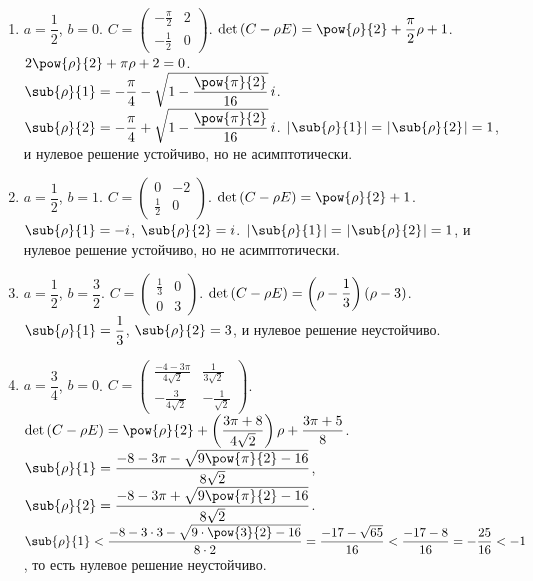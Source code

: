 \documentclass[a5paper,10pt]{article}
\begin{document}
\begin{enumerate}[label={\asbuk*})]
    \item $a = \dfrac {1} {2}$, $b = 0$. 
    $C = \begin{pmatrix} -\frac {\pi} {2} & 2 \\[0.25em] -\frac {1} {2} & 0 \end{pmatrix}$.
    $\det\br{C - \rho E} = \pow{\rho}{2} + \dfrac {\pi} {2} \rho + 1$.
    $2\pow{\rho}{2} + \pi \rho + 2 = 0$. \\
    $\sub{\rho}{1} = -\dfrac {\pi} {4} - \sqrt{1 - \dfrac {\pow{\pi}{2}} {16}}\, i$.
    $\sub{\rho}{2} = -\dfrac {\pi} {4} + \sqrt{1 - \dfrac {\pow{\pi}{2}} {16}}\,i$.
    \vspace{2mm}  $\vbr{\sub{\rho}{1}} = \vbr{\sub{\rho}{2}} = 1$,
    и нулевое решение устойчиво, но не асимптотически.
    
    \item $a = \dfrac {1} {2}$, $b = 1$.
    $C = \begin{pmatrix} 0 & -2 \\ \frac {1} {2} & 0 \end{pmatrix}$.
    $\det\br{C - \rho E} = \pow{\rho}{2} + 1$.
    $\sub{\rho}{1} = -i$,
    $\sub{\rho}{2} = i$.
    $\vbr{\sub{\rho}{1}} = \vbr{\sub{\rho}{2}} = 1$,
    и нулевое решение устойчиво, но не асимптотически.
    
    \item $a = \dfrac {1} {2}$, $b = \dfrac {3} {2}$.
    $C = \begin{pmatrix} \frac {1} {3} & 0 \\ 0 & 3 \end{pmatrix}$.
    $\det\left(\hspace{0.01em}C - \rho E\hspace{0.01em}\right) = \left(\hspace{0.01em}\rho - \dfrac {1} {3}\hspace{0.01em}\right) \left(\hspace{0.01em}\rho - 3\hspace{0.01em}\right)$.
    $\sub{\rho}{1} = \dfrac {1} {3}$, $\sub{\rho}{2} = 3$,
    и нулевое решение неустойчиво.
    
    \item $a = \dfrac {3} {4}$, $b = 0$.
    $C = \begin{pmatrix} 
        \frac {-4 - 3\pi} {4\sqrt{2}} & \frac {1} {3\sqrt{2}} \\[2mm]
        -\frac {3} {4\sqrt{2}} & -\frac {1} {\sqrt{2}} \end{pmatrix}$. \\
    $\det\br{C - \rho E} 
        = \pow{\rho}{2} 
        + \br{\dfrac {3\pi + 8} {4\sqrt{2}}}\rho 
        + \dfrac {3\pi + 5} {8}$. \\
    $\sub{\rho}{1} = \dfrac {-8 - 3\pi - \sqrt{9\pow{\pi}{2} - 16}} {8\sqrt{2}}$,
    $\sub{\rho}{2} = \dfrac {-8 - 3\pi + \sqrt{9\pow{\pi}{2} - 16}} {8\sqrt{2}}$. \\
    $\sub{\rho}{1} < \dfrac {-8 - 3 \cdot 3 - \sqrt{9 \cdot \pow{3}{2} - 16}} {8 \cdot 2} 
    = \dfrac {-17 - \sqrt{65}} {16} < \dfrac {-17 - 8} {16} = -\dfrac {25} {16} < -1$,
    то есть нулевое решение неустойчиво.
    

\end{enumerate}
\end{document}
